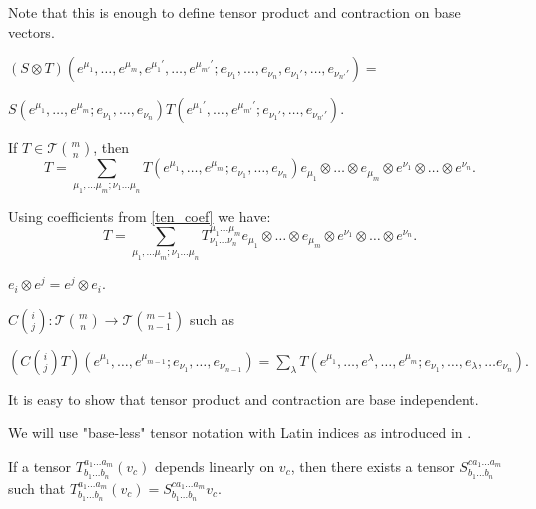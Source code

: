 \documentclass[main.tex]{subfiles}
\begin{document}
Note that this is enough to define tensor product and contraction on base vectors.
\begin{definition}
$(S\otimes T)(e^{\mu_1}, \dots, e^{\mu_m}, e^{\mu_1'}, \dots, e^{\mu_{m'}'};e_{\nu_1}, \dots, e_{\nu_n}, e_{\nu_1'}, \dots, e_{\nu_{n'}'}) = $

$S(e^{\mu_1}, \dots, e^{\mu_m};e_{\nu_1}, \dots, e_{\nu_n})T(e^{\mu_1'}, \dots, e^{\mu_{m'}'};e_{\nu_1'}, \dots, e_{\nu_{n'}'}).$
\end{definition}

\begin{corollary} If $T\in\mathcal{T}\binom{m}{n}$, then
\begin{equation}
T = \sum\limits_{\mu_1,\dots\mu_m;\nu_1\dots\mu_n} T(e^{\mu_1}, \dots, e^{\mu_m}; e_{\nu_1}, \dots, e_{\nu_n}) e_{\mu_1} \otimes \dots \otimes e_{\mu_m} \otimes e^{\nu_1} \otimes \dots \otimes e^{\nu_n}.
\end{equation}
\end{corollary}

Using coefficients from \ref{ten_coef} we have:
\begin{equation}
\boxed{T = \sum\limits_{\mu_1,\dots\mu_m;\nu_1\dots\mu_n} T^{\mu_1\dots\mu_m}_{\nu_1\dots\nu_n} e_{\mu_1} \otimes \dots \otimes e_{\mu_m} \otimes e^{\nu_1} \otimes \dots \otimes e^{\nu_n}.}
\end{equation}

\begin{remark}
$e_i \otimes e^j = e^j \otimes e_i.$
\end{remark}

\begin{definition}
$C\binom{i}{j}:\mathcal{T}\binom{m}{n}\to\mathcal{T}\binom{m - 1}{n - 1}$ such as

$(C\binom{i}{j}T)(e^{\mu_1}, \dots, e^{\mu_{m-1}}; e_{\nu_1}, \dots, e_{\nu_{n-1}}) = \sum_\lambda 
T(e^{\mu_1}, \dots, e^\lambda, \dots, e^{\mu_m}; e_{\nu_1}, \dots, e_\lambda, \dots e_{\nu_n}).$
\end{definition}

\noindent
It is easy to show that tensor product and contraction are base independent.

\noindent
We will use "base-less" tensor notation with Latin indices as introduced in \cite{wald1984}.

\begin{lemma}
If a tensor $T^{a_1\dots a_m}_{b_1\dots b_n}(v_c)$ depends linearly on $v_c$, then there exists a tensor 
$S^{c a_1\dots a_m}_{b_1\dots b_n}$ such that $T^{a_1\dots a_m}_{b_1\dots b_n}(v_c) = S^{c a_1\dots a_m}_{b_1\dots b_n} v_c.$
\end{lemma}
\end{document}
